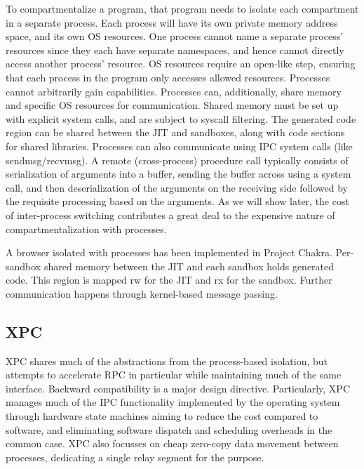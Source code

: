 To compartmentalize a program, that program needs to isolate each compartment in
a separate process.
Each process will have its own private memory address space, and its own 
OS resources.
One process cannot name a separate process' resources since they each have separate
namespaces, and hence cannot directly access another process' resource.
OS resources require an open-like step, ensuring that each process in the program
only accesses allowed resources.
Processes cannot arbitrarily gain capabilities.
Processes can, additionally, share memory and specific OS resources for 
communication.
Shared memory must be set up with explicit system calls, and are subject to 
syscall filtering.
The generated code region can be shared between the JIT and sandboxes, along
with code sections for shared libraries.
Processes can also communicate using IPC system calls (like sendmsg/recvmsg).
A remote (cross-process) procedure call typically consists of serialization of
arguments into a buffer, sending the buffer across using a system call,
and then deserialization of the arguments on the receiving side followed by
the requisite processing based on the arguments.
As we will show later, the cost of inter-process switching contributes a great
deal to the expensive nature of compartmentalization with processes.

A browser isolated with processes has been implemented in Project Chakra.
Per-sandbox shared memory between the JIT and each sandbox holds generated
code. 
This region is mapped rw for the JIT and rx for the sandbox.
Further communication happens through kernel-based message passing.


\subsection{XPC}

XPC shares much of the abstractions from the process-based isolation, but
attempts to accelerate RPC in particular while maintaining much of the same
interface.
Backward compatibility is a major design directive.
Particularly, XPC manages much of the IPC functionality implemented by the
operating system through hardware state machines aiming to reduce the cost
compared to software, and eliminating software dispatch and scheduling 
overheads in the common case.
XPC also focusses on cheap zero-copy data movement between processes,
dedicating a single relay segment for the purpose.

